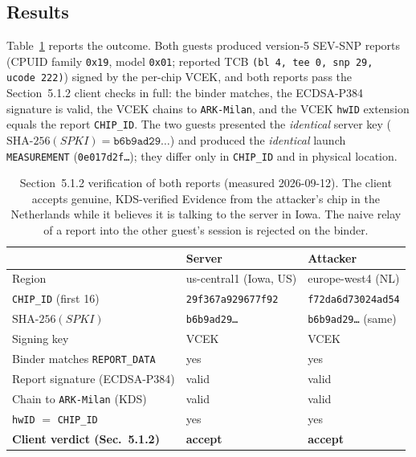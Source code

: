 \subsection{Results}
\label{sec:sev-snp-results}

Table~\ref{tab:sev-snp-results} reports the outcome. Both guests produced
version-5 SEV-SNP reports (CPUID family \texttt{0x19}, model \texttt{0x01};
reported TCB \texttt{(bl\,4, tee\,0, snp\,29, ucode\,222)}) signed by the
per-chip VCEK, and both reports pass the Section~5.1.2 client checks in full:
the binder matches, the ECDSA-P384 signature is valid, the VCEK chains to
\texttt{ARK-Milan}, and the VCEK \texttt{hwID} extension equals the report
\texttt{CHIP\_ID}. The two guests presented the \emph{identical} server key
($\mathrm{SHA\text{-}256}(\mathit{SPKI})=\texttt{b6b9ad29\ldots}$) and produced
the \emph{identical} launch \texttt{MEASUREMENT} (\texttt{0e017d2f\ldots}); they
differ only in \texttt{CHIP\_ID} and in physical location.

\begin{table}[t]
\centering
\caption{Section~5.1.2 verification of both reports (measured 2026-09-12). The
client accepts genuine, KDS-verified Evidence from the attacker's chip in the
Netherlands while it believes it is talking to the server in Iowa. The naive
relay of a report into the other guest's session is rejected on the binder.}
\label{tab:sev-snp-results}
\begin{tabular}{lll}
\toprule
 & \textbf{Server} & \textbf{Attacker} \\
\midrule
Region & us-central1 (Iowa, US) & europe-west4 (NL) \\
\texttt{CHIP\_ID} (first 16) & \texttt{29f367a929677f92} & \texttt{f72da6d73024ad54} \\
$\mathrm{SHA\text{-}256}(\mathit{SPKI})$ & \texttt{b6b9ad29\ldots} & \texttt{b6b9ad29\ldots} (same) \\
Signing key & VCEK & VCEK \\
Binder matches \texttt{REPORT\_DATA} & yes & yes \\
Report signature (ECDSA-P384) & valid & valid \\
Chain to \texttt{ARK-Milan} (KDS) & valid & valid \\
\texttt{hwID} $=$ \texttt{CHIP\_ID} & yes & yes \\
\midrule
\textbf{Client verdict (Sec.~5.1.2)} & \textbf{accept} & \textbf{accept} \\
\bottomrule
\end{tabular}
\end{table}

